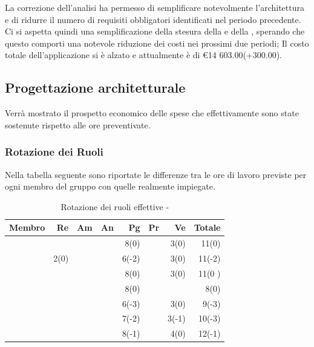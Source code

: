 \documentclass[12pt,a4paper]{article}
\begin{document}
\par La correzione dell'analisi ha permesso di semplificare notevolmente l'architettura e di ridurre il numero di requisiti obbligatori identificati nel periodo precedente. Ci si aspetta quindi una semplificazione della stesura della \ST{} e della \DP{}, sperando che questo comporti una notevole riduzione dei costi nei prossimi due periodi; Il costo totale dell'applicazione si è alzato e attualmente è di \euro{}14 603.00(+300.00).

\newpage

\subsection{Progettazione architetturale}
Verrà mostrato il prospetto economico delle spese che effettivamente sono state sostenute rispetto alle ore preventivate.

\subsubsection{Rotazione dei Ruoli}
Nella tabella seguente sono riportate le differenze tra le ore di lavoro previste per ogni membro del gruppo con quelle realmente impiegate.

\begin{table}[H]
	\begin{center}
		\begin{tabular}{l r r r r r r r}
			\toprule
			\textbf{Membro}	&	\textbf{Re}	&	\textbf{Am}	& \textbf{An} & \textbf{Pg} & \textbf{Pr} & \textbf{Ve} & \textbf{Totale}\\
			\midrule
			\midrule
            \IB{} & & & & 8(0) & & 3(0) & 11(0) \\
			\midrule
            \AB{} & 2(0) & & & 6(-2) & & 3(0) & 11(-2) \\
			\midrule
            \NDC{} & & & & 8(0) & & 3(0) & 11(0	) \\
			\midrule
            \TP{} & & & & 8(0) & & & 8(0) \\
			\midrule
            \WS{} & & & & 6(-3) & & 3(0) & 9(-3) \\
			\midrule
            \AVE{} & & & & 7(-2) & & 3(-1) & 10(-3) \\
			\midrule
            \AVI{} & & & & 8(-1) & & 4(0) & 12(-1) \\
			\bottomrule
		\end{tabular}
		\caption{Rotazione dei ruoli effettive - \FPA{}}
	\end{center}
\end{table}
\end{document}
